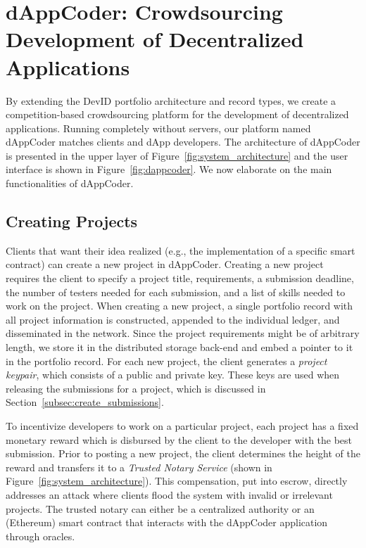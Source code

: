 \section{dAppCoder: Crowdsourcing Development of Decentralized Applications}
\label{sec:dappcoder}
By extending the DevID portfolio architecture and record types, we create a competition-based crowdsourcing platform for the development of decentralized applications.
Running completely without servers, our platform named dAppCoder matches clients and dApp developers.
The architecture of dAppCoder is presented in the upper layer of Figure~\ref{fig:system_architecture} and the user interface is shown in Figure~\ref{fig:dappcoder}.
We now elaborate on the main functionalities of dAppCoder.

\subsection{Creating Projects}
Clients that want their idea realized (e.g., the implementation of a specific smart contract) can create a new project in dAppCoder.
Creating a new project requires the client to specify a project title, requirements, a submission deadline, the number of testers needed for each submission, and a list of skills needed to work on the project.
When creating a new project, a single portfolio record with all project information is constructed, appended to the individual ledger, and disseminated in the network.
Since the project requirements might be of arbitrary length, we store it in the distributed storage back-end and embed a pointer to it in the portfolio record.
For each new project, the client generates a \textit{project keypair}, which consists of a public and private key.
These keys are used when releasing the submissions for a project, which is discussed in Section~\ref{subsec:create_submissions}.

To incentivize developers to work on a particular project, each project has a fixed monetary reward which is disbursed by the client to the developer with the best submission.
Prior to posting a new project, the client determines the height of the reward and transfers it to a \textit{Trusted Notary Service} (shown in Figure~\ref{fig:system_architecture}).
This compensation, put into escrow, directly addresses an attack where clients flood the system with invalid or irrelevant projects.
The trusted notary can either be a centralized authority or an (Ethereum) smart contract that interacts with the dAppCoder application through oracles.

